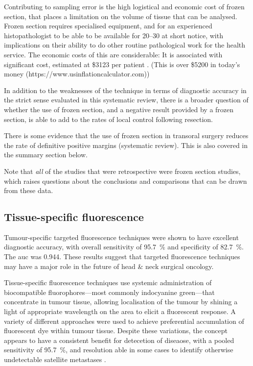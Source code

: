 Contributing to sampling error is the high logistical and economic cost of frozen section, that places a limitation on the volume of tissue that can be analysed.
Frozen section requires specialised equipment, and for an experienced histopathologist to be able to be available for \SIrange{20}{30}{\minutes} at short notice, with implications on their ability to do other routine pathological work for the health service. 
The economic costs of this are considerable: 
It is associated with significant cost, estimated at \$3123 per patient \cite{dinardoAccuracyUtilityCost2000}. 
(This is over \$5200 in today's money (https://www.usinflationcalculator.com))

In addition to the weaknesses of the technique in terms of diagnostic accuracy in the strict sense evaluated in this systematic review, there is a broader question of whether the use of frozen section, and a negative result provided by a frozen section, is able to add to the rates of local control following resection.

There is some evidence that the use of frozen section in transoral surgery reduces the rate of definitive positive margins (systematic review)\cite{gorpheSystematicReviewMetaanalysis2019}. This is also covered in the summary section below.

Note that \emph{all} of the studies that were retrospective were frozen section studies, which raises questions about the conclusions and comparisons that can be drawn from these data.

\subsection{Tissue-specific fluorescence}

Tumour-specific targeted fluorescence techniques were shown to have excellent diagnostic accuracy, with overall sensitivity of \SI{95.7}{\percent} and specificity of \SI{82.7}{\percent}. 
The \gls{auc} was 0.944.
These results suggest that targeted fluorescence techniques may have a major role in the future of head \& neck surgical oncology.

Tissue-specific fluorescence techniques use systemic administration of biocompatible fluorophores---most commonly indocyanine green---that concentrate in tumour tissue, allowing localisation of the tumour  by shining a light of appropriate wavelength on the area to elicit a fluorescent response.
A variety of different approaches were used to achieve preferential accumulation of fluorescent dye within tumour tissue.
Despite these variations, the concept appears to have a consistent benefit for detecetion of diseaose, with a pooled sensitivity of \SI{95.7}{\percent}, and resolution able in some cases to identify otherwise undetectable satellite metastases \cite{voskuilf.j.ImageguidedSurgeryTumor2019}.

